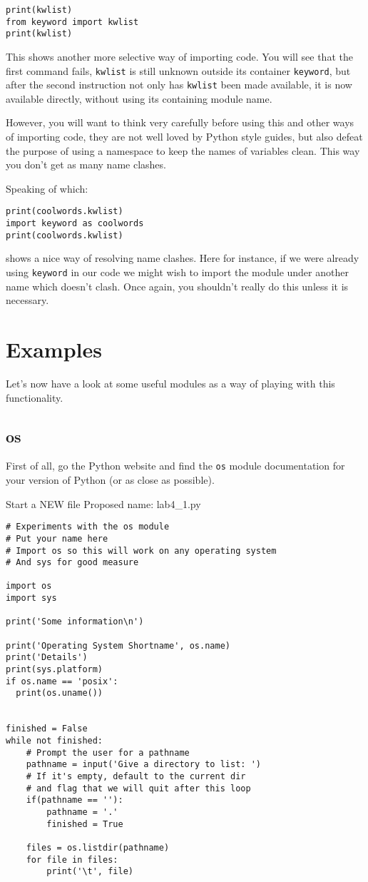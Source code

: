 \documentclass[12pt,oneside]{cttutorial}
\begin{document}
\begin{lstlisting}
print(kwlist)
from keyword import kwlist
print(kwlist)
\end{lstlisting}

This shows another more selective way of importing code. You will see that the first command fails, \lstinline!kwlist! is still unknown outside its container \lstinline!keyword!, but after the second instruction not only has \lstinline!kwlist! been made available, it is now available directly, without using its containing module name.

However, you will want to think very carefully before using this and other ways of importing code, they are not well loved by Python style guides, but also defeat the purpose of using a namespace to keep the names of variables clean. This way you don't get as many name clashes.

Speaking of which:

\begin{lstlisting}
print(coolwords.kwlist)
import keyword as coolwords
print(coolwords.kwlist)
\end{lstlisting}

shows a nice way of resolving name clashes. Here for instance, if we were already using \lstinline!keyword! in our code we might wish to import the module under another name which doesn't clash. Once again, you shouldn't really do this unless it is necessary.


\section{Examples}

Let's now have a look at some useful modules as a way of playing with this functionality.


\subsection{os}

First of all, go the Python website and find the \lstinline!os! module documentation for your version of Python (or as close as possible).

\alert{Start a NEW file}
Proposed name: lab4\_1.py
\begin{lstlisting}
# Experiments with the os module
# Put your name here
# Import os so this will work on any operating system
# And sys for good measure

import os
import sys

print('Some information\n')

print('Operating System Shortname', os.name)
print('Details')
print(sys.platform)
if os.name == 'posix':
  print(os.uname())


finished = False
while not finished:
    # Prompt the user for a pathname
    pathname = input('Give a directory to list: ')
    # If it's empty, default to the current dir
    # and flag that we will quit after this loop
    if(pathname == ''):
        pathname = '.'
        finished = True
        
    files = os.listdir(pathname)
    for file in files:
        print('\t', file)
\end{lstlisting}
\end{document}
